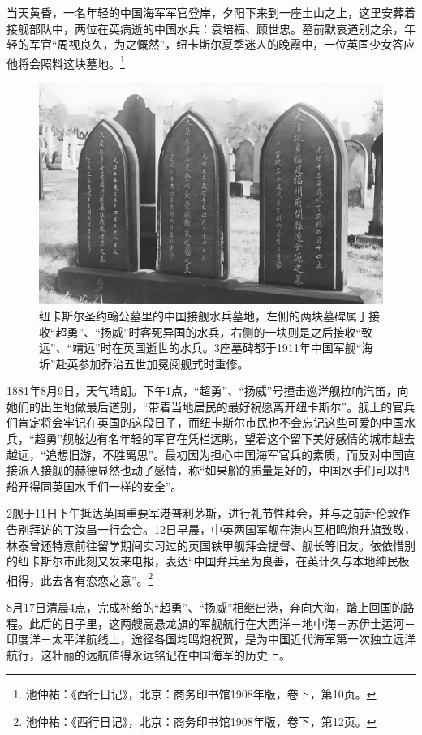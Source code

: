 \documentclass[12pt,UTF8]{ctexbook}
\begin{document}
当天黄昏，一名年轻的中国海军军官登岸，夕阳下来到一座土山之上，这里安葬着接舰部队中，两位在英病逝的中国水兵：袁培福、顾世忠。墓前默哀道别之余，年轻的军官“周视良久，为之慨然”，纽卡斯尔夏季迷人的晚霞中，一位英国少女答应他将会照料这块墓地。\footnote{池仲祐：《西行日记》，北京：商务印书馆1908年版，卷下，第10页。}

\begin{figure}[htbp]
	\centering
	\includegraphics[width=1\linewidth]{Images/35}
	\caption{纽卡斯尔圣约翰公墓里的中国接舰水兵墓地，左侧的两块墓碑属于接收“超勇”、“扬威”时客死异国的水兵，右侧的一块则是之后接收“致远”、“靖远”时在英国逝世的水兵。3座墓碑都于1911年中国军舰“海圻”赴英参加乔治五世加冕阅舰式时重修。}
	\label{fig:1}
\end{figure}

1881年8月9日，天气晴朗。下午1点，“超勇”、“扬威”号撞击巡洋舰拉响汽笛，向她们的出生地做最后道别，“带着当地居民的最好祝愿离开纽卡斯尔”。舰上的官兵们肯定将会牢记在英国的这段日子，而纽卡斯尔市民也不会忘记这些可爱的中国水兵，“超勇”舰舷边有名年轻的军官在凭栏远眺，望着这个留下美好感情的城市越去越远，“追想旧游，不胜离思”。最初因为担心中国海军官兵的素质，而反对中国直接派人接舰的赫德显然也动了感情，称“如果船的质量是好的，中国水手们可以把船开得同英国水手们一样的安全”。

2舰于11日下午抵达英国重要军港普利茅斯，进行礼节性拜会，并与之前赴伦敦作告别拜访的丁汝昌一行会合。12日早晨，中英两国军舰在港内互相鸣炮升旗致敬，林泰曾还特意前往留学期间实习过的英国铁甲舰拜会提督、舰长等旧友。依依惜别的纽卡斯尔市此刻又发来电报，表达“中国弁兵至为良善，在英计久与本地绅民极相得，此去各有恋恋之意”。\footnote{池仲祐：《西行日记》，北京：商务印书馆1908年版，卷下，第12页。}

8月17日清晨4点，完成补给的“超勇”、“扬威”相继出港，奔向大海，踏上回国的路程。此后的日子里，这两艘高悬龙旗的军舰航行在大西洋－地中海－苏伊士运河－印度洋－太平洋航线上，途径各国均鸣炮祝贺，是为中国近代海军第一次独立远洋航行，这壮丽的远航值得永远铭记在中国海军的历史上。
\end{document}
